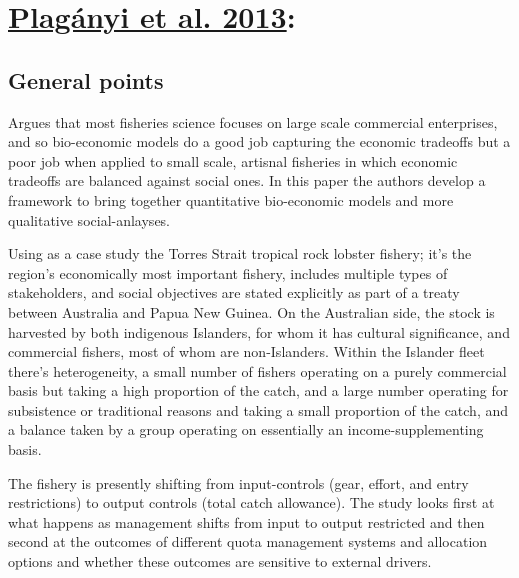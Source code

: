 \documentclass[a4paper,10pt]{article}
\begin{document}
\section*{\href{run:Integrating indigenous livelihood and lifestyle ob.pdf alias}{\color{Blue}Plag\'anyi et al. 2013}:}

\subsection*{General points}
Argues that most fisheries science focuses on large scale commercial enterprises, and so bio-economic models do a good job capturing the economic tradeoffs but a poor job when applied to small scale, artisnal fisheries in which economic tradeoffs are balanced against social ones. In this paper the authors develop a framework to bring together quantitative bio-economic models and more qualitative social-anlayses. 

Using as a case study the Torres Strait tropical rock lobster fishery; it's the region's economically most important fishery, includes multiple types of stakeholders, and social objectives are stated explicitly as part of a treaty between Australia and Papua New Guinea. On the Australian side, the stock is harvested by both indigenous Islanders, for whom it has cultural significance, and commercial fishers, most of whom are non-Islanders. Within the Islander fleet there's heterogeneity, a small number of fishers operating on a purely commercial basis but taking a high proportion of the catch, and a large number operating for subsistence or traditional reasons and taking a small proportion of the catch, and a balance taken by a group operating on essentially an income-supplementing basis. 


The fishery is presently shifting from input-controls (gear, effort, and entry restrictions) to output controls (total catch allowance). The study looks first at what happens as management shifts from input to output restricted and then second at the outcomes of different quota management systems and allocation options and whether these outcomes are sensitive to external drivers.
\end{document}
